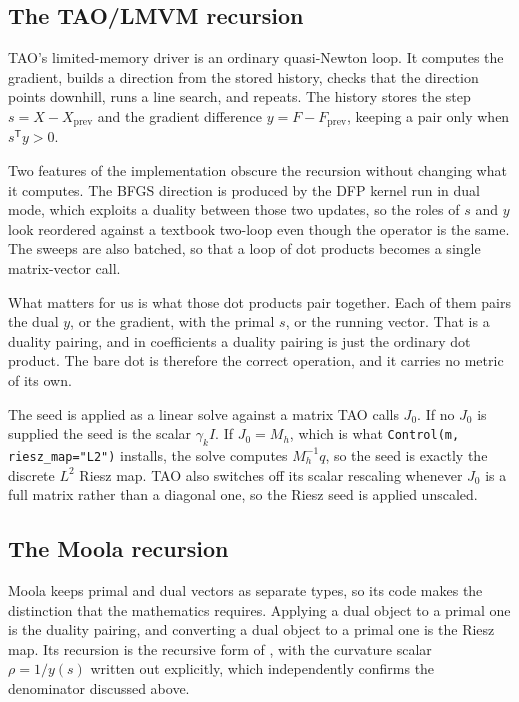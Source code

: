 \documentclass[a4paper,11pt]{article}
\theoremstyle{spacedplain} \newtheorem{theorem}[counter]{Theorem} \newtheorem{lemma}[counter]{Lemma} \newtheorem{prop}[counter]{Proposition} \newtheorem{cor}[counter]{Corollary}
\theoremstyle{spaceddefinition} \newtheorem{defn}[counter]{Definition} \newtheorem{example}[counter]{Example} \newtheorem{remark}[counter]{Remark}
\begin{document}
\subsection{The TAO/LMVM recursion}
\label{sec:lbfgs:tao}

TAO's limited-memory driver is an ordinary quasi-Newton loop. It computes the gradient, builds a direction from the stored history, checks that the direction points downhill, runs a line search, and repeats. The history stores the step $s = X - X_{\text{prev}}$ and the gradient difference $y = F - F_{\text{prev}}$, keeping a pair only when $s^{\mathsf T} y > 0$.

Two features of the implementation obscure the recursion without changing what it computes. The BFGS direction is produced by the DFP kernel run in dual mode, which exploits a duality between those two updates, so the roles of $s$ and $y$ look reordered against a textbook two-loop even though the operator is the same. The sweeps are also batched, so that a loop of dot products becomes a single matrix-vector call.

What matters for us is what those dot products pair together. Each of them pairs the dual $y$, or the gradient, with the primal $s$, or the running vector. That is a duality pairing, and in coefficients a duality pairing is just the ordinary dot product. The bare dot is therefore the correct operation, and it carries no metric of its own.

The seed is applied as a linear solve against a matrix TAO calls $J_0$. If no $J_0$ is supplied the seed is the scalar $\gamma_k I$. If $J_0 = M_h$, which is what \texttt{Control(m, riesz\_map="L2")} installs, the solve computes $M_h^{-1} q$, so the seed is exactly the discrete $L^{2}$ Riesz map. TAO also switches off its scalar rescaling whenever $J_0$ is a full matrix rather than a diagonal one, so the Riesz seed is applied unscaled.

\subsection{The Moola recursion}
\label{sec:lbfgs:moola}

Moola keeps primal and dual vectors as separate types, so its code makes the distinction that the mathematics requires. Applying a dual object to a primal one is the duality pairing, and converting a dual object to a primal one is the Riesz map. Its recursion is the recursive form of \citet[(1.210)]{shfp2017}, with the curvature scalar $\rho = 1/y(s)$ written out explicitly, which independently confirms the denominator discussed above.
\end{document}
